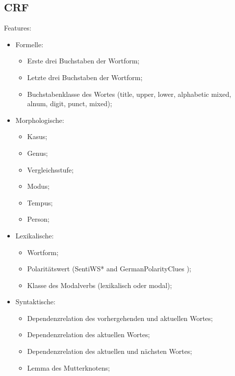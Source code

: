 \documentclass{beamer}
\begin{document}
    \subsection{CRF}
    \begin{frame}{\insertsubsection}
      Features:
      \begin{multicols}{2}
        \begin{itemize}
        \item Formelle:
          \begin{itemize}
            \tiny
          \item Erste drei Buchstaben der Wortform;
          \item Letzte drei Buchstaben der Wortform;
          \item Buchstabenklasse des Wortes (title, upper, lower, alphabetic
            mixed, alnum, digit, punct, mixed);
          \end{itemize}
        \item Morphologische:
          \begin{itemize}
            \tiny
          \item Kasus;
          \item Genus;
          \item Vergleichsstufe;
          \item Modus;
          \item Tempus;
          \item Person;
          \end{itemize}
        \item Lexikalische:
          \begin{itemize}
            \tiny
          \item Wortform;
          \item Polarit\"atswert (SentiWS* \cite{Remus-10} and
            GermanPolarityClues \cite{Waltinger-10});
          \item Klasse des Modalverbs (lexikalisch oder modal);
          \end{itemize}
        \item Syntaktische:
          \begin{itemize}
            \tiny
            \item Dependenzrelation des vorhergehenden und aktuellen Wortes;
            \item Dependenzrelation des aktuellen Wortes;
            \item Dependenzrelation des aktuellen und n\"achsten Wortes;
            \item Lemma des Mutterknotens;

\end{itemize}
\end{itemize}
\end{multicols}
\end{frame}
\end{document}
